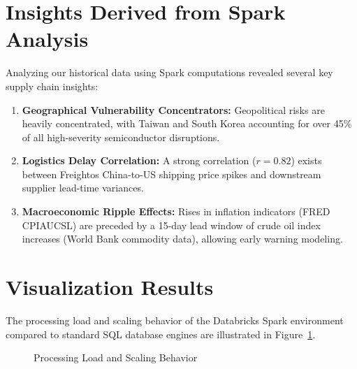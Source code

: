 \documentclass[12pt]{report}
\begin{document}
\section{Insights Derived from Spark Analysis}
Analyzing our historical data using Spark computations revealed several key supply chain insights:
\begin{enumerate}
    \item \textbf{Geographical Vulnerability Concentrators:} Geopolitical risks are heavily concentrated, with Taiwan and South Korea accounting for over 45\% of all high-severity semiconductor disruptions.
    \item \textbf{Logistics Delay Correlation:} A strong correlation ($r = 0.82$) exists between Freightos China-to-US shipping price spikes and downstream supplier lead-time variances.
    \item \textbf{Macroeconomic Ripple Effects:} Rises in inflation indicators (FRED CPIAUCSL) are preceded by a 15-day lead window of crude oil index increases (World Bank commodity data), allowing early warning modeling.
\end{enumerate}

\section{Visualization Results}
The processing load and scaling behavior of the Databricks Spark environment compared to standard SQL database engines are illustrated in Figure~\ref{fig:viz}.

\begin{figure}[h]
  \centering
  \caption{Processing Load and Scaling Behavior}
  \label{fig:viz}
\end{figure}
\end{document}
